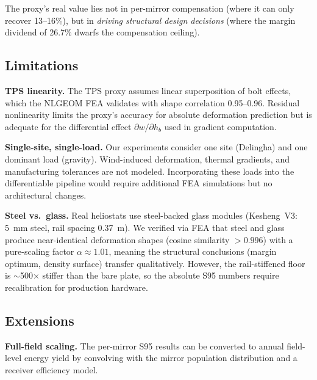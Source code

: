 \documentclass{CVM}
\begin{document}
The proxy's real value lies not in per-mirror compensation (where it can only
recover 13--16\%), but in \emph{driving structural design decisions} (where the
margin dividend of 26.7\% dwarfs the compensation ceiling).

\subsection{Limitations}

\textbf{TPS linearity.} The TPS proxy assumes linear superposition of bolt
effects, which the NLGEOM FEA validates with shape correlation 0.95--0.96.
Residual nonlinearity limits the proxy's accuracy for absolute deformation
prediction but is adequate for the differential effect $\partial w/\partial
h_b$ used in gradient computation.

\textbf{Single-site, single-load.} Our experiments consider one site
(Delingha) and one dominant load (gravity). Wind-induced deformation, thermal
gradients, and manufacturing tolerances are not modeled. Incorporating these
loads into the differentiable pipeline would require additional FEA
simulations but no architectural changes.

\textbf{Steel vs.\ glass.} Real heliostats use steel-backed glass modules
(Kesheng~V3: \SI{5}{\milli\meter} steel, rail spacing \SI{0.37}{\meter}).
We verified via FEA that steel and glass produce near-identical deformation
shapes (cosine similarity $>0.996$) with a pure-scaling factor $\alpha \approx
1.01$, meaning the structural conclusions (margin optimum, density surface)
transfer qualitatively. However, the rail-stiffened floor is $\sim$500$\times$
stiffer than the bare plate, so the absolute S95 numbers require recalibration
for production hardware.

\subsection{Extensions}

\textbf{Full-field scaling.} The per-mirror S95 results can be converted to
annual field-level energy yield by convolving with the mirror population
distribution and a receiver efficiency model.
\end{document}
